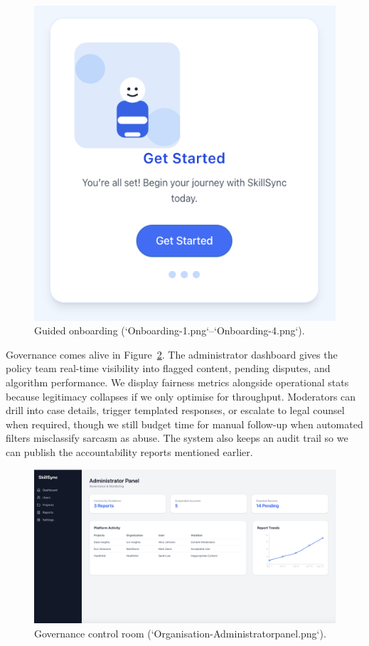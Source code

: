 \begin{figure}[h]
\begin{minipage}[b]{0.48\linewidth}
    \includegraphics[width=\linewidth]{figures/Onboarding-4.png}
  \end{minipage}
  \caption{Guided onboarding (`Onboarding-1.png`--`Onboarding-4.png`).}
  \label{fig:onboarding-flow}
\end{figure}

Governance comes alive in Figure~\ref{fig:admin-panel}. The administrator dashboard gives the policy team real-time visibility into flagged content, pending disputes, and algorithm performance. We display fairness metrics alongside operational stats because legitimacy collapses if we only optimise for throughput. Moderators can drill into case details, trigger templated responses, or escalate to legal counsel when required, though we still budget time for manual follow-up when automated filters misclassify sarcasm as abuse. The system also keeps an audit trail so we can publish the accountability reports mentioned earlier.

\begin{figure}[h]
  \centering
  \includegraphics[width=0.85\linewidth]{figures/Organisation-Administratorpanel.png}
  \caption{Governance control room (`Organisation-Administratorpanel.png`).}
  \label{fig:admin-panel}
\end{figure}

